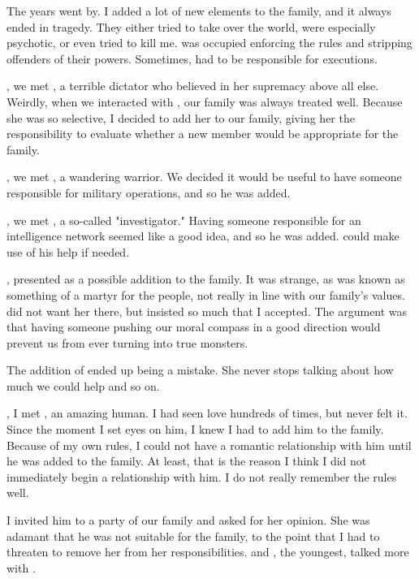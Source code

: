 {The years went by. I added a lot of new elements to the family, and it always ended in tragedy. They either tried to take over the world, were especially psychotic, or even tried to kill me.  was occupied enforcing the rules and stripping offenders of their powers. Sometimes,  had to be responsible for executions.

, we met , a terrible dictator who believed in her supremacy above all else. Weirdly, when we interacted with , our family was always treated well. Because she was so selective, I decided to add her to our family, giving her the responsibility to evaluate whether a new member would be appropriate for the family.

, we met , a wandering warrior. We decided it would be useful to have someone responsible for military operations, and so he was added.

, we met , a so-called "investigator." Having someone responsible for an intelligence network seemed like a good idea, and so he was added.  could make use of his help if needed.

,  presented  as a possible addition to the family. It was strange, as  was known as something of a martyr for the people, not really in line with our family's values.  did not want her there, but  insisted so much that I accepted. The argument was that having someone pushing our moral compass in a good direction would prevent us from ever turning into true monsters.

The addition of  ended up being a mistake. She never stops talking about how much we could help and so on.

, I met , an amazing human. I had seen love hundreds of times, but never felt it. Since the moment I set eyes on him, I knew I had to add him to the family. Because of my own rules, I could not have a romantic relationship with him until he was added to the family. At least, that is the reason I think I did not immediately begin a relationship with him. I do not really remember the rules well.

I invited him to a party of our family and asked  for her opinion. She was adamant that he was not suitable for the family, to the point that I had to threaten to remove her from her responsibilities.  and , the youngest, talked more with .

}
